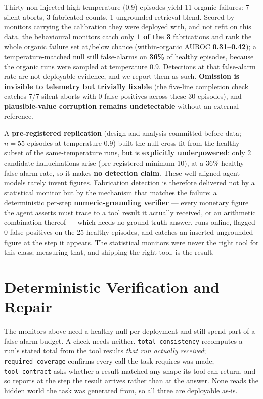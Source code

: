 \documentclass{article}
\begin{document}
Thirty non-injected high-temperature (0.9) episodes yield 11 organic failures: 7 silent aborts, 3 fabricated counts, 1 ungrounded retrieval blend. Scored by monitors carrying the calibration they were deployed with, and not refit on this data, the behavioural monitors catch only \textbf{1 of the 3} fabrications and rank the whole organic failure set at/below chance (within-organic AUROC \textbf{0.31--0.42}); a temperature-matched null still false-alarms on \textbf{36\%} of healthy episodes, because the organic runs were sampled at temperature 0.9. Detections at that false-alarm rate are not deployable evidence, and we report them as such. \textbf{Omission is invisible to telemetry but trivially fixable} (the five-line completion check catches 7/7 silent aborts with 0 false positives across these 30 episodes), and \textbf{plausible-value corruption remains undetectable} without an external reference.

A \textbf{pre-registered replication} (design and analysis committed before data; $n=55$ episodes at temperature 0.9) built the null cross-fit from the healthy subset of the same-temperature runs, but is \textbf{explicitly underpowered}: only 2 candidate hallucinations arise (pre-registered minimum 10), at a 36\% healthy false-alarm rate, so it makes \textbf{no detection claim}. These well-aligned agent models rarely invent figures. Fabrication detection is therefore delivered not by a statistical monitor but by the mechanism that matches the failure: a deterministic per-step \textbf{numeric-grounding verifier} --- every monetary figure the agent asserts must trace to a tool result it actually received, or an arithmetic combination thereof --- which needs no ground-truth answer, runs online, flagged 0 false positives on the 25 healthy episodes, and catches an inserted ungrounded figure at the step it appears. The statistical monitors were never the right tool for this class; measuring that, and shipping the right tool, is the result.

\section{Deterministic Verification and Repair}
\label{sec:verify}

The monitors above need a healthy null per deployment and still spend part of a
false-alarm budget. A check needs neither. \texttt{total\_consistency}
recomputes a run's stated total from the tool results \emph{that run actually
received}; \texttt{required\_coverage} confirms every call the task requires was
made; \texttt{tool\_contract} asks whether a result matched any shape its tool can
return, and so reports at the step the result arrives rather than at the answer.
None reads the hidden world the task was generated from, so all three are
deployable as-is.
\end{document}

